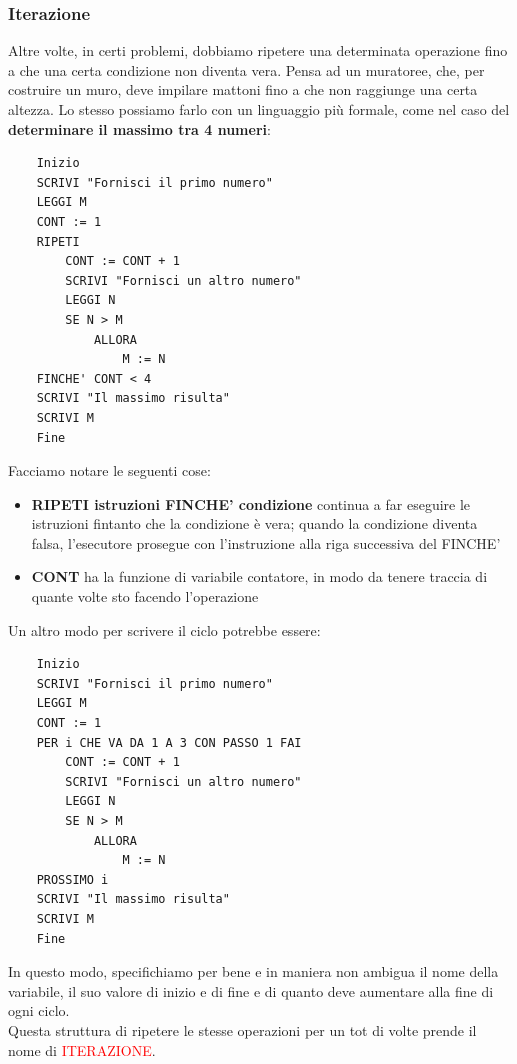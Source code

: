 \documentclass{article}
\begin{document}
	\subsubsection{Iterazione}
	Altre volte, in certi problemi, dobbiamo ripetere una determinata operazione fino a che una certa condizione non diventa vera. Pensa ad un muratoree, che, per costruire un muro, deve impilare mattoni fino a che non raggiunge una certa altezza. Lo stesso possiamo farlo con un linguaggio più formale, come nel caso del \textbf{determinare il massimo tra 4 numeri}:\\
	\begin{lstlisting}
	Inizio
	SCRIVI "Fornisci il primo numero"
	LEGGI M
	CONT := 1
	RIPETI
		CONT := CONT + 1
		SCRIVI "Fornisci un altro numero"
		LEGGI N
		SE N > M
			ALLORA
				M := N
	FINCHE' CONT < 4
	SCRIVI "Il massimo risulta"
	SCRIVI M
	Fine
	\end{lstlisting}
	Facciamo notare le seguenti cose:
	\begin{itemize} 
		\item \textbf{RIPETI istruzioni FINCHE' condizione} continua a far eseguire le istruzioni fintanto che la condizione è vera; quando la condizione diventa falsa, l'esecutore prosegue con l'instruzione alla riga successiva del FINCHE'
		\item \textbf{CONT} ha la funzione di variabile contatore, in modo da tenere traccia di quante volte sto facendo l'operazione
	\end{itemize}
	Un altro modo per scrivere il ciclo potrebbe essere:\\
	\begin{lstlisting}
	Inizio
	SCRIVI "Fornisci il primo numero"
	LEGGI M
	CONT := 1
	PER i CHE VA DA 1 A 3 CON PASSO 1 FAI
		CONT := CONT + 1
		SCRIVI "Fornisci un altro numero"
		LEGGI N
		SE N > M
			ALLORA
				M := N
	PROSSIMO i
	SCRIVI "Il massimo risulta"
	SCRIVI M
	Fine
	\end{lstlisting}
	In questo modo, specifichiamo per bene e in maniera non ambigua il nome della variabile, il suo valore di inizio e di fine e di quanto deve aumentare alla fine di ogni ciclo.\\
	Questa struttura di ripetere le stesse operazioni per un tot di volte prende il nome di \textcolor{red}{ITERAZIONE}.
	
	\pagebreak
	
\end{document}
